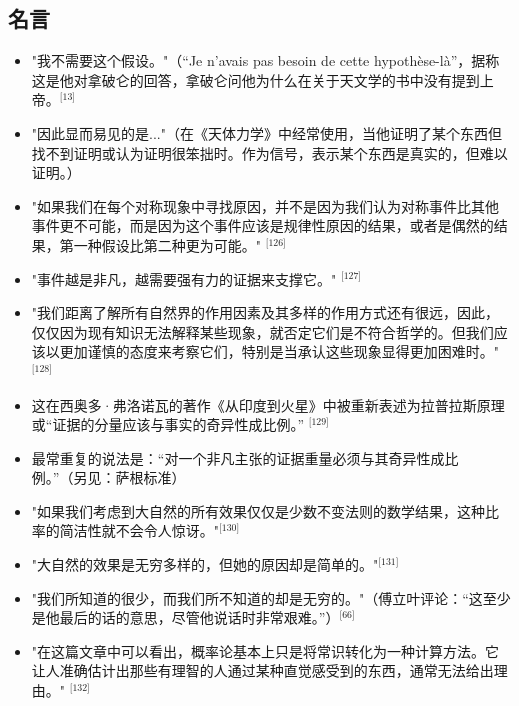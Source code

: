 \subsection{名言}  
\begin{itemize}
\item "我不需要这个假设。"（“Je n'avais pas besoin de cette hypothèse-là”，据称这是他对拿破仑的回答，拿破仑问他为什么在关于天文学的书中没有提到上帝。\(^\text{[13]}\)  
\item "因此显而易见的是..."（在《天体力学》中经常使用，当他证明了某个东西但找不到证明或认为证明很笨拙时。作为信号，表示某个东西是真实的，但难以证明。）  
\item "如果我们在每个对称现象中寻找原因，并不是因为我们认为对称事件比其他事件更不可能，而是因为这个事件应该是规律性原因的结果，或者是偶然的结果，第一种假设比第二种更为可能。" \(^\text{[126]}\)
\item "事件越是非凡，越需要强有力的证据来支撑它。" \(^\text{[127]}\)  
\item "我们距离了解所有自然界的作用因素及其多样的作用方式还有很远，因此，仅仅因为现有知识无法解释某些现象，就否定它们是不符合哲学的。但我们应该以更加谨慎的态度来考察它们，特别是当承认这些现象显得更加困难时。" \(^\text{[128]}\) 
\item 这在西奥多·弗洛诺瓦的著作《从印度到火星》中被重新表述为拉普拉斯原理或“证据的分量应该与事实的奇异性成比例。” \(^\text{[129]}\) 
\item 最常重复的说法是：“对一个非凡主张的证据重量必须与其奇异性成比例。”（另见：萨根标准）  
\item "如果我们考虑到大自然的所有效果仅仅是少数不变法则的数学结果，这种比率的简洁性就不会令人惊讶。"\(^\text{[130]}\) 
\item "大自然的效果是无穷多样的，但她的原因却是简单的。"\(^\text{[131]}\) 
\item "我们所知道的很少，而我们所不知道的却是无穷的。"（傅立叶评论：“这至少是他最后的话的意思，尽管他说话时非常艰难。”）\(^\text{[66]}\)   
\item "在这篇文章中可以看出，概率论基本上只是将常识转化为一种计算方法。它让人准确估计出那些有理智的人通过某种直觉感受到的东西，通常无法给出理由。" \(^\text{[132]}\) 
\end{itemize}
